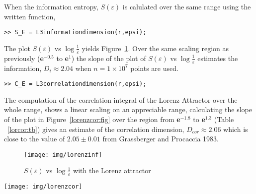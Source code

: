 When the information entropy, $S(\varepsilon)$ is calulated over the same range using the written function,
\begin{verbatim}
>> S_E = L3informationdimension(r,epsi);
\end{verbatim}
 The plot $S(\varepsilon)$ vs $\log{\frac{1}{\varepsilon}}$ yields Figure~\ref{lorenzinf:fig}. Over the same scaling region as previously (\textbf{e$^{-0.5}$} to \textbf{e$^{1}$}) the slope of the plot of $S(\varepsilon)$ vs $\log{\frac{1}{\varepsilon}}$ estimates the information, $D_{i} \approx 2.04$ when $n = 1 \times 10^{7}$ points are used.  
\begin{verbatim}
>> C_E = L3correlationdimension(r,epsi);
\end{verbatim}
The computation of the correlation integral of the Lorenz Attractor over the whole range, shows a linear scaling on an appreciable range, calculating the slope of the plot in Figure~\ref{lorenzcor:fig} over the region from \textbf{e$^{-1.8}$} to \textbf{e$^{1.3}$} (Table ~\ref{lorcor:tb})  gives an estimate of the correlation dimension, $D_{cor} \approx 2.06$ which is close to the value of $2.05 \pm 0.01$ from Grassberger and Procaccia 1983.
\begin{figure}[h]
\begin{center}
\texttt{[image: img/lorenzinf]}
\caption{$S(\varepsilon)$ vs $\log{\frac{1}{\varepsilon}}$ with the Lorenz attractor}
\label{lorenzinf:fig}
\end{center}
\end{figure}
\begin{center}
\texttt{[image: img/lorenzcor]}
\label{lorenzcor:fig}
\end{center}



